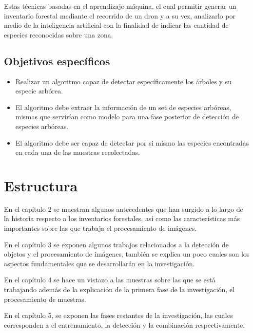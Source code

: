 Estas técnicas  basadas en el aprendizaje máquina, el cual permitir
generar un inventario forestal mediante el recorrido de un dron y a su vez, analizarlo por medio de la inteligencia artificial con la finalidad de indicar las cantidad de especies reconocidas sobre una zona.

\subsection{Objetivos específicos}
\begin{itemize}
\item Realizar un algoritmo capaz de detectar específicamente los árboles y su especie arbórea.
\end{itemize}

\begin{itemize}
\item El algoritmo debe extraer la información de un set de especies arbóreas, mismas que servirían como modelo para una fase posterior de detección de especies arbóreas.
\end{itemize}

\begin{itemize}
\item El algoritmo debe ser capaz de detectar por si mismo las especies encontradas en cada una de las muestras recolectadas.
\end{itemize}

\pagebreak

\section{Estructura}
En el capítulo 2 se muestran algunos antecedentes que han surgido a lo largo
de la historia respecto a los inventarios forestales, así como las características más importantes sobre las que trabaja el procesamiento de imágenes.

En el capítulo 3 se exponen algunos trabajos relacionados a la detección de
objetos y el procesamiento de imágenes, también se explica un poco cuales son los aspectos fundamentales que se desarrollarán en la investigación.

En el capítulo 4 se hace un vistazo a las muestras sobre las que se está trabajando además de la explicación de la primera fase de la investigación, el procesamiento de muestras.

En el capítulo 5, se exponen las fases restantes de la investigación, las cuales corresponden a el entrenamiento, la detección y la combinación respectivamente.


